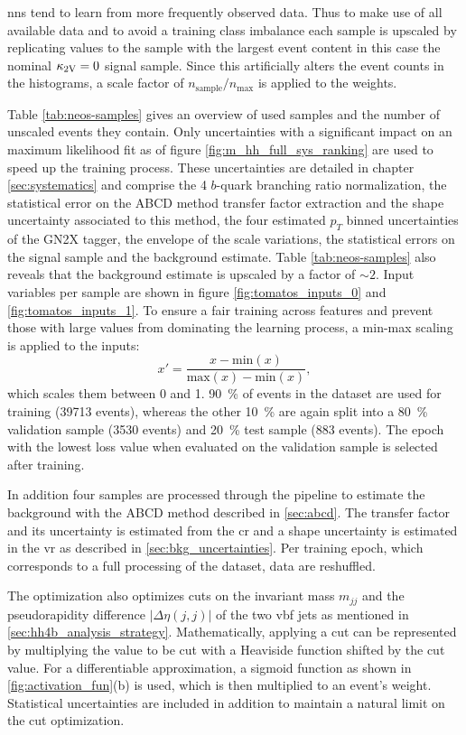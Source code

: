 \acp{nn} tend to learn from more frequently observed data. Thus to make use of all available data and to avoid a training class imbalance each sample is upscaled by replicating values to the sample with the largest event content in this case the nominal $\kappa_{\text{2V}}=0$ signal sample. Since this artificially alters the event counts in the histograms, a scale factor of $n_\text{sample}/n_\text{max}$ is applied to the weights.

Table \ref{tab:neos-samples} gives an overview of used samples and the number of unscaled events they contain. Only uncertainties with a significant impact on an \mhh{} maximum likelihood fit as of figure \ref{fig:m_hh_full_sys_ranking} are used to speed up the training process. These uncertainties are detailed in chapter \ref{sec:systematics} and comprise the 4 $b$-quark branching ratio normalization, the statistical error on the ABCD method transfer factor extraction and the shape uncertainty associated to this method, the four estimated $p_T$ binned uncertainties of the GN2X tagger, the envelope of the scale variations, the statistical errors on the \ktwov signal sample and the background estimate. Table \ref{tab:neos-samples} also reveals that the background estimate is upscaled by a factor of $\sim 2$. Input variables per sample are shown in figure \ref{fig:tomatos_inputs_0} and \ref{fig:tomatos_inputs_1}. To ensure a fair training across features and prevent those with large values from dominating the learning process, a min-max scaling is applied to the inputs:
\begin{equation}
    x'=\frac{x - \text{min}(x)}{\text{max}(x)-\text{min}(x)},
\end{equation}
which scales them between 0 and 1. \qty[]{90}{\percent} of events in the dataset are used for training (39713 events), whereas the other \qty[]{10}{\percent} are again split into a \qty[]{80}{\percent} validation sample (3530 events) and \qty[]{20}{\percent} test sample (883 events). The epoch with the lowest loss value when evaluated on the validation sample is selected after training.

In addition four samples are processed through the pipeline to estimate the background with the ABCD method described in \ref{sec:abcd}. The transfer factor and its uncertainty is estimated from the \ac{cr} and a shape uncertainty is estimated in the \ac{vr} as described in \ref{sec:bkg_uncertainties}. Per training epoch, which corresponds to a full processing of the dataset, data are reshuffled.

The optimization also optimizes cuts on the invariant mass $m_{jj}$ and the pseudorapidity difference $|\Delta\eta(j,j)|$ of the two \ac{vbf} jets as mentioned in \ref{sec:hh4b_analysis_strategy}. Mathematically, applying a cut can be represented by multiplying the value to be cut with a Heaviside function shifted by the cut value. For a differentiable approximation, a sigmoid function as shown in \ref{fig:activation_fun}(b) is used, which is then multiplied to an event's weight. Statistical uncertainties are included in addition to maintain a natural limit on the cut optimization.

